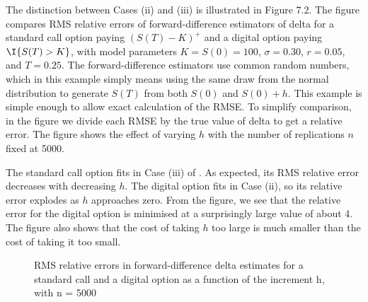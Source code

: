 The distinction between Cases (ii) and (iii) is illustrated in Figure 7.2. The figure compares RMS relative errors of forward-difference estimators of
delta for a standard call option paying $(S(T) - K)^+$ and a digital option paying $\I\{S(T) > K\}$, with model parameters $K = S(0) = 100$, $\sigma = 0.30$, $r =
	0.05$, and $T = 0.25$. The forward-difference estimators use common random numbers, which in this example simply means using the same draw from the
normal distribution to generate $S(T)$ from both $S(0)$ and $S(0) + h$. This
example is simple enough to allow exact calculation of the RMSE. To simplify comparison, in the figure we divide each RMSE by the true value of delta to
get a relative error. The figure shows the effect of varying $h$ with the number of replications $n$ fixed at 5000.

The standard call option fits in Case (iii) of . As expected, its RMS relative error decreases
with decreasing $h$. The digital option fits in Case (ii), so its relative error explodes as $h$ approaches zero. From the figure, we see that the relative error
for the digital option is minimised at a surprisingly large value of about 4. The figure also shows that the cost of taking $h$ too large is much smaller than the cost of taking it too small.

\begin{figure}[H]
	\centering
	
	\caption{RMS relative errors in forward-difference delta estimates for a standard call and a digital option as a function of the increment h, with n = 5000}
	\label{fig:RMSErrorComparison}
\end{figure}
